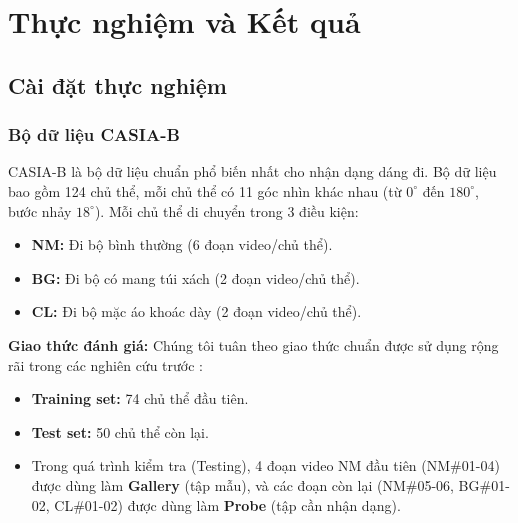 \chapter{Thực nghiệm và Kết quả}
\label{Chapter4}

\section{Cài đặt thực nghiệm}

\subsection{Bộ dữ liệu CASIA-B}
CASIA-B \cite{yu2006framework} là bộ dữ liệu chuẩn phổ biến nhất cho nhận dạng dáng đi. Bộ dữ liệu bao gồm 124 chủ thể, mỗi chủ thể có 11 góc nhìn khác nhau (từ $0^\circ$ đến $180^\circ$, bước nhảy $18^\circ$). Mỗi chủ thể di chuyển trong 3 điều kiện:
\begin{itemize}
    \item \textbf{NM:} Đi bộ bình thường (6 đoạn video/chủ thể).
    \item \textbf{BG:} Đi bộ có mang túi xách (2 đoạn video/chủ thể).
    \item \textbf{CL:} Đi bộ mặc áo khoác dày (2 đoạn video/chủ thể).
\end{itemize}

\textbf{Giao thức đánh giá:} Chúng tôi tuân theo giao thức chuẩn được sử dụng rộng rãi trong các nghiên cứu trước \cite{chao2019gaitset,fan2020gaitpart}:
\begin{itemize}
    \item \textbf{Training set:} 74 chủ thể đầu tiên.
    \item \textbf{Test set:} 50 chủ thể còn lại.
    \item Trong quá trình kiểm tra (Testing), 4 đoạn video NM đầu tiên (NM\#01-04) được dùng làm \textbf{Gallery} (tập mẫu), và các đoạn còn lại (NM\#05-06, BG\#01-02, CL\#01-02) được dùng làm \textbf{Probe} (tập cần nhận dạng).
\end{itemize}

